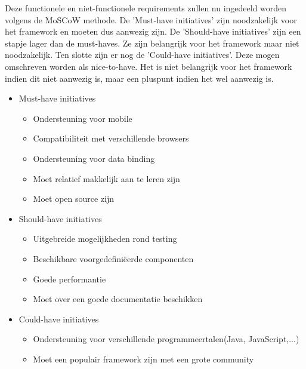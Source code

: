 Deze functionele en niet-functionele requirements zullen nu ingedeeld worden volgens de MoSCoW methode.\autocite{ProductPlan2019}
De 'Must-have initiatives' zijn noodzakelijk voor het framework en moeten dus aanwezig zijn.
De 'Should-have initiatives' zijn een stapje lager dan de must-haves. Ze zijn belangrijk voor het framework maar niet noodzakelijk.
Ten slotte zijn er nog de 'Could-have initiatives'. Deze mogen omschreven worden als nice-to-have. Het is niet belangrijk voor het framework indien dit niet aanwezig is, maar een pluspunt indien het wel aanwezig is.

\begin{itemize}
	\item  Must-have initiatives
	\begin{itemize}
	\item Ondersteuning voor mobile
	\item Compatibiliteit met verschillende browsers
	\item Ondersteuning voor data binding
	\item Moet relatief makkelijk aan te leren zijn
	\item Moet open source zijn	 
	\end{itemize}
	\item Should-have initiatives
	\begin{itemize}
	\item Uitgebreide mogelijkheden rond testing
	\item Beschikbare voorgedefiniëerde componenten 
	\item Goede performantie
	\item Moet over een goede documentatie beschikken
	\end{itemize}
		\item Could-have initiatives
		\begin{itemize}
	\item Ondersteuning voor verschillende programmeertalen(Java, JavaScript,...)
	\item Moet een populair framework zijn met een grote community
		\end{itemize}
\end{itemize}
